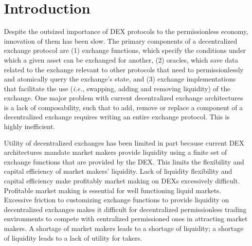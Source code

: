 \documentclass[tikz]{article}
\begin{document}
\newpage

\thispagestyle{empty} %

\cleardoublepage
{}
{\large\tableofcontents} %
\cleardoublepage
{}


\newpage
\setcounter{page}{3} %

\section{Introduction}
Despite the outsized importance of DEX protocols to the permissionless economy, innovation of them has been slow. The primary components of a decentralized exchange protocol are (1) exchange functions, which specify the conditions under which a given asset can be exchanged for another, (2) oracles, which save data related to the exchange relevant to other protocols that need to permissionlessly and atomically query the exchange's state, and (3) exchange implementations that facilitate the use (\textit{i.e.}, swapping, adding and removing liquidity) of the exchange. One major problem with current decentralized exchange architectures is a lack of composability, such that to add, remove or replace a component of a decentralized exchange requires writing an entire exchange protocol. This is highly inefficient.

Utility of decentralized exchanges has been limited in part because current DEX architectures mandate market makers provide liquidity using a finite set of exchange functions that are provided by the DEX. This limits the flexibility and capital efficiency of market makers' liquidity. Lack of liquidity flexibility and capital efficiency make profitably market making on DEXs excessively difficult. Profitable market making is essential for well functioning liquid markets. Excessive friction to customizing exchange functions to provide liquidity on decentralized exchanges makes it difficult for decentralized permissionless trading environments to compete with centralized permissioned ones in attracting market makers. A shortage of market makers leads to a shortage of liquidity; a shortage of liquidity leads to a lack of utility for takers. 
\end{document}
